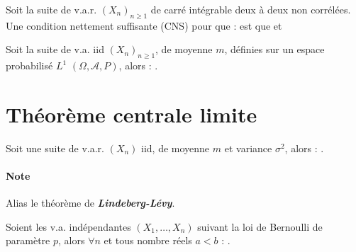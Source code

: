 \documentclass[10pt, french]{report}
\begin{document}
\begin{multicols*}{2}
\begin{definitionNOHFILL}
Soit la suite de v.a.r. $(X_{n})_{n \geq 1}$ de carré intégrable deux à deux non corrélées. Une condition nettement suffisante (CNS) pour que :  est que  et 
\end{definitionNOHFILL}



\begin{definitionNOHFILL}
Soit la suite de v.a. iid $(X_{n})_{n \geq 1}$, de moyenne $m$, définies sur un espace probabilisé $L^{1}$ $(\Omega, \mathcal{A}, P)$, alors : .
\end{definitionNOHFILL}



\columnbreak
\section{Théorème centrale limite}
\begin{definitionNOHFILL}
Soit une suite de v.a.r. $(X_{n})$ iid, de moyenne $m$ et variance $\sigma^{2}$, alors : .

\paragraph{Note}	Alias le théorème de \textbf{\textit{Lindeberg-Lévy}}.
\end{definitionNOHFILL}

\begin{definitionNOHFILLsub}
Soient les v.a. indépendantes $(X_{1}, \dots, X_{n})$ suivant la loi de Bernoulli de paramètre $p$, alors $\forall n$ et tous nombre réels $a < b$ : .


\end{definitionNOHFILLsub}
\end{multicols*}
\end{document}
